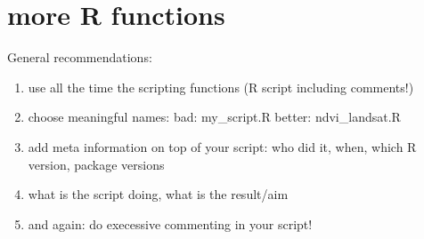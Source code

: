 % 



\section{more R functions}

{
}


\begin{frame}{General recommendations:}
 
      \begin{enumerate}[<+->]
	\item use all the time the scripting functions (R script including comments!)
	\item choose meaningful names: bad: my\_script.R better: ndvi\_landsat.R
	\item add meta information on top of your script: who did it, when, which R version, package versions
	\item what is the script doing, what is the result/aim
	\item and again: do execessive commenting in your script!
      \end{enumerate}

\end{frame}


